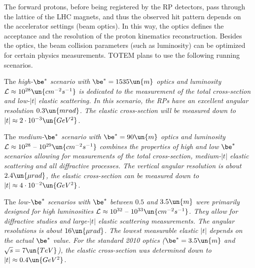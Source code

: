 
The forward protons, before being registered by the RP detectors, pass through the lattice of the LHC magnets, and thus the observed hit pattern depends on the accelerator settings (beam optics). In this way, the optics defines the acceptance and the resolution of the proton kinematics reconstruction. Besides the optics, the beam collision parameters (such as luminosity) can be optimized for certain physics measurements. TOTEM plans to use the following running scenarios.

\> The \em{high-$\be^*$} scenario with $\be^* = 1535\un{m}$ optics and luminosity ${\cal L} \approx 10^{28} \un{cm^{-2}s^{-1}}$ is dedicated to the measurement of the total cross-section and low-$|t|$ elastic scattering. In this scenario, the RPs have an excellent angular resolution $0.3\un{mrad}$. The elastic cross-section will be measured down to $|t| \approx 2\cdot10^{-3}\un{GeV^2}$.

\> The \em{medium-$\be^*$} scenario with $\be^* = 90\un{m}$ optics and luminosity ${\cal L} \approx 10^{28} \hbox{ -- } 10^{29}\un{cm^{-2}s^{-1}}$ combines the properties of high and low $\be^*$ scenarios allowing for measurements of the total cross-section, medium-$|t|$ elastic scattering and all diffractive processes. The vertical angular resolution is about $2.4\un{\mu rad}$, the elastic cross-section can be measured down to $|t| \approx 4\cdot 10^{-2}\un{GeV^2}$.

\> The \em{low-$\be^*$} scenarios with $\be^*$ between $0.5$ and $3.5\un{m}$ were primarily designed for high luminosities ${\cal L} \approx 10^{32} \hbox{ -- } 10^{33}\un{cm^{-2}s^{-1}}$. They allow for diffractive studies and large-$|t|$ elastic scattering measurements. The angular resolutions is about $16\un{\mu rad}$. The lowest measurable elastic $|t|$ depends on the actual $\be^*$ value. For the standard 2010 optics ($\be^* = 3.5\un{m}$ and $\sqrt s = 7\un{TeV}$), the elastic cross-section was determined down to $|t| \approx 0.4\un{GeV^2}$.

